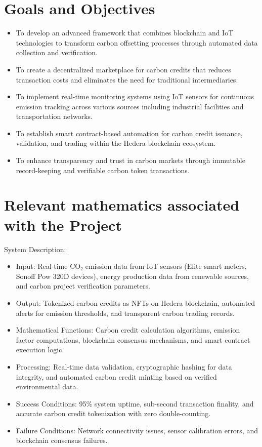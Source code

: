 \documentclass[oneside,a4paper,12pt]{book}
\begin{document}
\section{Goals and Objectives}
\begin{itemize}
    \item To develop an advanced framework that combines blockchain and IoT technologies to transform carbon offsetting processes through automated data collection and verification.
    \item To create a decentralized marketplace for carbon credits that reduces transaction costs and eliminates the need for traditional intermediaries.
    \item To implement real-time monitoring systems using IoT sensors for continuous emission tracking across various sources including industrial facilities and transportation networks.
    \item To establish smart contract-based automation for carbon credit issuance, validation, and trading within the Hedera blockchain ecosystem.
    \item To enhance transparency and trust in carbon markets through immutable record-keeping and verifiable carbon token transactions.
\end{itemize}

\section{Relevant mathematics associated with the Project}
\label{sec:math}
System Description:
\begin{itemize} 
\item Input: Real-time CO₂ emission data from IoT sensors (Elite smart meters, Sonoff Pow 320D devices), energy production data from renewable sources, and carbon project verification parameters.
\item Output: Tokenized carbon credits as NFTs on Hedera blockchain, automated alerts for emission thresholds, and transparent carbon trading records.
\item Mathematical Functions: Carbon credit calculation algorithms, emission factor computations, blockchain consensus mechanisms, and smart contract execution logic.
\item Processing: Real-time data validation, cryptographic hashing for data integrity, and automated carbon credit minting based on verified environmental data.
\item Success Conditions: 95\% system uptime, sub-second transaction finality, and accurate carbon credit tokenization with zero double-counting.
\item Failure Conditions: Network connectivity issues, sensor calibration errors, and blockchain consensus failures.		
\end{itemize}
\end{document}

